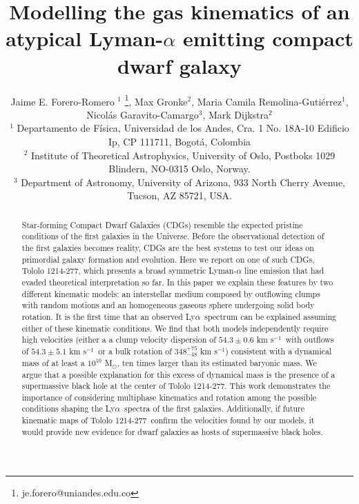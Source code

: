 \documentclass[a4,useAMS,usenatbib,usegraphicx]{mn2e}
\newcommand{\tol}{Tololo 1214-277}
\newcommand{\lya}{Ly$\alpha$}
\newcommand{\sigmaclump}{$54.3\pm 0.6$ km s$^{-1}$}
\newcommand{\inftyclump}{$54.3\pm 5.1$ km s$^{-1}$}
\begin{document}
\title[An atypical Lyman-$\alpha$ dwarf galaxy]{
Modelling the gas kinematics of an atypical Lyman-$\alpha$ emitting compact dwarf galaxy}
\author[J.E. Forero-Romero et al.]
{Jaime E. Forero-Romero $^{1}$ \thanks{je.forero@uniandes.edu.co},
Max Gronke$^2$, 
Maria Camila Remolina-Guti\'errez$^1$,
\newauthor
Nicol\'as Garavito-Camargo$^3$, 
Mark Dijkstra$^2$\\
$^1$ Departamento de F\'isica, Universidad de los Andes, Cra. 1
  No. 18A-10 Edificio Ip, CP 111711, Bogot\'a, Colombia \\
$^2$ Institute of Theoretical Astrophysics, University of Oslo,
Postboks 1029 Blindern, NO-0315 Oslo, Norway.\\
$^3$ Department of Astronomy, University of Arizona, 933 North Cherry
Avenue, Tucson, AZ 85721, USA. 
}


\maketitle


\begin{abstract}
  Star-forming Compact Dwarf Galaxies (CDGs) resemble the expected
  pristine conditions of the first galaxies in the Universe.    
Before the observational detection of the first galaxies becomes
reality, CDGs are the best systems to test our ideas on primordial
galaxy formation and evolution.    
Here we report on one of such CDGs, \tol, which presents
a broad symmetric Lyman-$\alpha$ line emission that had evaded theoretical
interpretation so far. 
In this paper we explain these features by two different kinematic models: 
an interstellar medium composed by outflowing clumps with 
random motions and an homogeneous gaseous sphere undergoing solid body
rotation.
It is the first time that an observed \lya\ spectrum can be explained
assuming either of these kinematic conditions.
We find that both models independently require high velocities
(either a  a clump velocity dispersion of \sigmaclump\ with outflows of
\inftyclump\ or a bulk rotation of $348^{+75}_{-48}$ km s$^{-1}$)
consistent with a dynamical mass of at 
least a $10^{10}$ M$_{\odot}$, ten times larger than its estimated baryonic mass.   
We argue that a possible explanation for this excess of
dynamical mass is the presence of a supermassive black hole at the
center of \tol. 
This work demonstrates the importance of considering multiphase
kinematics and rotation among the possible conditions shaping the
\lya\ spectra of the first galaxies.  
Additionally, if future kinematic maps of \tol\ confirm the 
velocities found by our models, it would provide new
evidence for dwarf galaxies as hosts of supermassive black
holes.  
\end{abstract}
\end{document}
